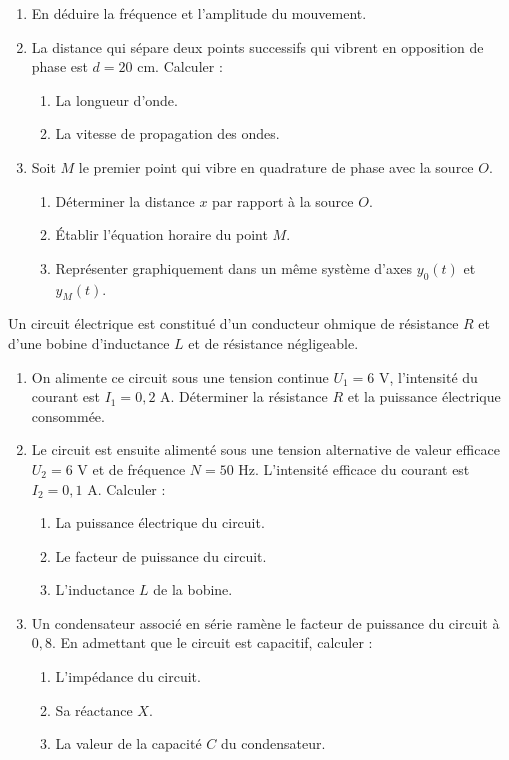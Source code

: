 \documentclass[11pt]{article}
\begin{document}
\begin{enumerate}
  \item En déduire la fréquence et l'amplitude du mouvement.
  \item La distance qui sépare deux points successifs qui vibrent en opposition de phase est $d = 20$ cm. Calculer :
  \begin{enumerate}[label=\alph*.]
    \item La longueur d'onde.
    \item La vitesse de propagation des ondes.
  \end{enumerate}
  \item Soit $M$ le premier point qui vibre en quadrature de phase avec la source $O$.
  \begin{enumerate}[label=\alph*.]
    \item Déterminer la distance $x$ par rapport à la source $O$.
    \item Établir l'équation horaire du point $M$.
    \item Représenter graphiquement dans un même système d'axes $y_0(t)$ et $y_M(t)$.
  \end{enumerate}
\end{enumerate}

Un circuit électrique est constitué d'un conducteur ohmique de résistance $R$ et d'une bobine d'inductance $L$ et de résistance négligeable.

\begin{enumerate}
  \item On alimente ce circuit sous une tension continue $U_1 = 6$ V, l'intensité du courant est $I_1 = 0{,}2$ A. Déterminer la résistance $R$ et la puissance électrique consommée.
  \item Le circuit est ensuite alimenté sous une tension alternative de valeur efficace $U_2 = 6$ V et de fréquence $N = 50$ Hz. L'intensité efficace du courant est $I_2 = 0{,}1$ A. Calculer :
  \begin{enumerate}[label=\alph*.]
    \item La puissance électrique du circuit.
    \item Le facteur de puissance du circuit.
    \item L'inductance $L$ de la bobine.
  \end{enumerate}
  \item Un condensateur associé en série ramène le facteur de puissance du circuit à $0{,}8$. En admettant que le circuit est capacitif, calculer :
  \begin{enumerate}[label=\alph*.]
    \item L'impédance du circuit.
    \item Sa réactance $X$.
    \item La valeur de la capacité $C$ du condensateur.
  \end{enumerate}
\end{enumerate}
\end{document}
